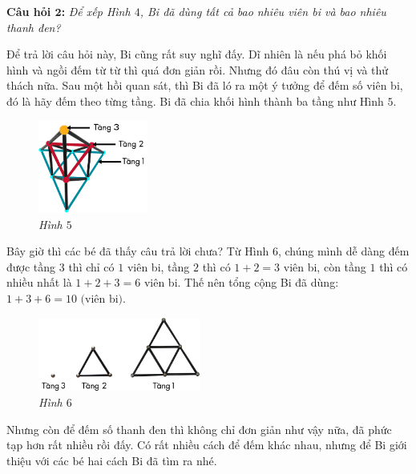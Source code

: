 	\textbf{Câu hỏi $\pmb{2}$:} \textit{Để xếp Hình $4$, Bi đã dùng tất cả bao nhiêu viên bi và bao nhiêu thanh đen?}
	\vspace*{-5pt}
	\begin{multicols}{2}
		Để trả lời câu hỏi này, Bi cũng rất suy nghĩ đấy. Dĩ nhiên là nếu phá bỏ khối hình và ngồi đếm từ từ thì quá đơn giản rồi. Nhưng đó đâu còn thú vị và thử thách nữa. Sau một hồi quan sát, thì Bi đã ló ra một ý tưởng để đếm số viên bi, đó là hãy đếm theo từng tầng. Bi đã chia khối hình thành ba tầng như Hình $5$.
		\begin{figure}[H]
			\centering
			\vspace*{-5pt}
			\captionsetup{labelformat= empty, justification=centering} \includegraphics[width=0.32\textwidth]{5}
			
			\vspace*{-10pt}
			\caption{\small\textit{Hình $5$}}
			\vspace*{-5pt}
		\end{figure}
	\end{multicols}
	Bây giờ thì các bé đã thấy câu trả lời chưa? Từ  Hình $6$, chúng mình dễ dàng đếm được tầng $3$ thì chỉ có $1$ viên bi, tầng $2$ thì có $1+2 = 3$ viên bi, còn tầng $1$ thì có nhiều nhất là $1 + 2 + 3 = 6$ viên bi. Thế nên tổng cộng Bi đã dùng:
	$1 + 3 + 6 = 10 \text{ (viên bi)}.$
	\begin{multicols}{2}
		\begin{figure}[H]
			\centering
			\vspace*{15pt}
			\captionsetup{labelformat= empty, justification=centering} \includegraphics[width=0.475\textwidth]{6}
			\caption{\small\textit{Hình $6$}}
			\vspace*{-5pt}
		\end{figure}
		Nhưng còn để đếm số thanh đen thì không chỉ đơn giản như vậy nữa, đã phức tạp hơn rất nhiều rồi đấy. Có rất nhiều cách để đếm khác nhau, nhưng để Bi giới thiệu với các bé hai cách Bi đã tìm ra nhé.
	\end{multicols}

